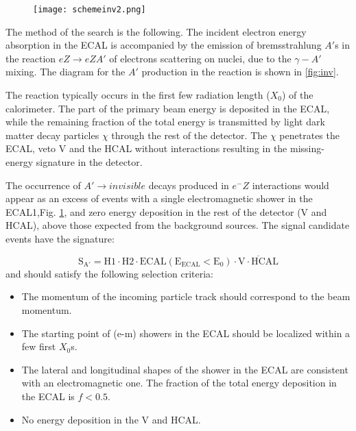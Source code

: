 \begin{figure}[ht]
	\hspace*{\fill}
	\centering
	\texttt{[image: schemeinv2.png]}
	\hspace*{\fill}
	\caption{}\label{fig:schemeinv}
\end{figure}
The method of the search is the following. The incident electron energy absorption in the ECAL is accompanied by the
emission of bremsstrahlung $A'$s in the reaction $eZ\rightarrow eZA'$ of electrons scattering on nuclei, due to the
$\gamma - A'$ mixing. The diagram for the $A'$ production in the reaction is shown in \ref{fig:inv}.\par
The reaction typically occurs in the first few radiation length ($X_0$) of the calorimeter. The part of the primary beam
energy is deposited in the ECAL, while the remaining fraction of the total energy is transmitted by light dark matter
decay particles $\chi$ through the rest of the detector. The $\chi$ penetrates the ECAL, veto V and the HCAL without
interactions resulting in the missing-energy signature in the detector.\par
The occurrence of $A'\rightarrow invisible$ decays produced in $e^-Z$ interactions would appear as an excess of events
with a single electromagnetic shower in the ECAL1,Fig. \ref{fig:schemeinv}, and zero energy deposition in the rest of
the detector (V and HCAL), above those expected from the background sources. The signal candidate events have the
signature:\par


\begin{equation}
\mathrm{ S_{A'} = H1 \cdot H2\cdot ECAL (E_{ECAL}<E_0)\cdot \overline{V\cdot HCAL}}
\end{equation}
and should satisfy the following selection criteria:
\begin{itemize}
\item The momentum of the incoming particle track should correspond to the beam momentum.
\item The starting point of (e-m) showers in the ECAL should be localized within a few first $X_0$s.
\item The lateral and longitudinal shapes of the shower in the ECAL are consistent with an electromagnetic one. The
fraction of the total energy deposition in the ECAL is $f<0.5$.
\item No energy deposition in the V and HCAL.
\end{itemize}

